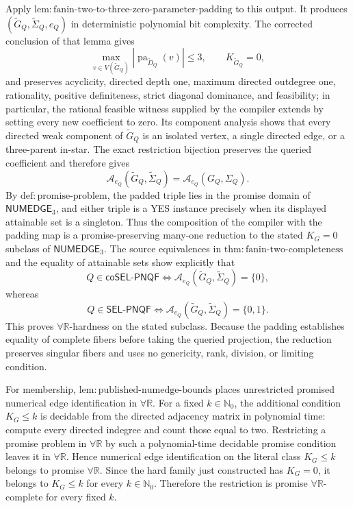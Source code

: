 Apply \(\mathrm{lem:fanin\mbox{-}two\mbox{-}to\mbox{-}three\mbox{-}zero\mbox{-}parameter\mbox{-}padding}\) to this output. It produces \((\widetilde G_Q,\widetilde\Sigma_Q,e_Q)\) in deterministic polynomial bit complexity. The corrected conclusion of that lemma gives
\[
\max_{v\in V(\widetilde G_Q)}
|\operatorname{pa}_{\widetilde D_Q}(v)|\le3,
\qquad K_{\widetilde G_Q}=0,
\]
and preserves acyclicity, directed depth one, maximum directed outdegree one, rationality, positive definiteness, strict diagonal dominance, and feasibility; in particular, the rational feasible witness supplied by the compiler extends by setting every new coefficient to zero. Its component analysis shows that every directed weak component of \(\widetilde G_Q\) is an isolated vertex, a single directed edge, or a three-parent in-star. The exact restriction bijection preserves the queried coefficient and therefore gives
\[
\mathcal A_{e_Q}(\widetilde G_Q,\widetilde\Sigma_Q)
=\mathcal A_{e_Q}(G_Q,\Sigma_Q).
\]
By \(\mathrm{def:promise\mbox{-}problem}\), the padded triple lies in the promise domain of \(\mathsf{NUMEDGE}_3\), and either triple is a YES instance precisely when its displayed attainable set is a singleton. Thus the composition of the compiler with the padding map is a promise-preserving many-one reduction to the stated \(K_G=0\) subclass of \(\mathsf{NUMEDGE}_3\). The source equivalences in \(\mathrm{thm:fanin\mbox{-}two\mbox{-}completeness}\) and the equality of attainable sets show explicitly that
\[
Q\in\mathsf{coSEL\mbox{-}PNQF}
\Longleftrightarrow
\mathcal A_{e_Q}(\widetilde G_Q,\widetilde\Sigma_Q)=\{0\},
\]
whereas
\[
Q\in\mathsf{SEL\mbox{-}PNQF}
\Longleftrightarrow
\mathcal A_{e_Q}(\widetilde G_Q,\widetilde\Sigma_Q)=\{0,1\}.
\]
This proves \(\forall\mathbb R\)-hardness on the stated subclass. Because the padding establishes equality of complete fibers before taking the queried projection, the reduction preserves singular fibers and uses no genericity, rank, division, or limiting condition.

For membership, \(\mathrm{lem:published\mbox{-}numedge\mbox{-}bounds}\) places unrestricted promised numerical edge identification in \(\forall\mathbb R\). For a fixed \(k\in\mathbb N_0\), the additional condition \(K_G\le k\) is decidable from the directed adjacency matrix in polynomial time: compute every directed indegree and count those equal to two. Restricting a promise problem in \(\forall\mathbb R\) by such a polynomial-time decidable promise condition leaves it in \(\forall\mathbb R\). Hence numerical edge identification on the literal class \(K_G\le k\) belongs to promise \(\forall\mathbb R\). Since the hard family just constructed has \(K_G=0\), it belongs to \(K_G\le k\) for every \(k\in\mathbb N_0\). Therefore the restriction is promise \(\forall\mathbb R\)-complete for every fixed \(k\).

